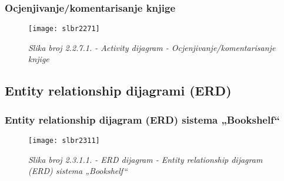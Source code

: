 \documentclass[a4paper oneside ,12pt]{article}
\begin{document}
\subsubsection{Ocjenjivanje/komentarisanje knjige}
\begin{center}
\begin{figure}[H] 
\begin{center}
\texttt{[image: slbr2271]}
\caption*{\textit{Slika broj 2.2.7.1. - Activity dijagram - Ocjenjivanje/komentarisanje knjige}}
\end{center}
\end{figure}
\end{center}

\subsection{Entity relationship dijagrami (ERD)}
\subsubsection{Entity relationship dijagram (ERD) sistema „Bookshelf“}
\begin{center}
\begin{figure}[H] 
\begin{center}
\texttt{[image: slbr2311]}
\caption*{\textit{Slika broj 2.3.1.1. - ERD dijagram - Entity relationship dijagram (ERD) sistema „Bookshelf“}}
\end{center}
\end{figure}
\end{center} 
\end{document}
